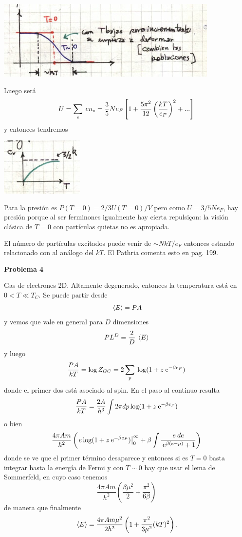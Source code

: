 \documentclass[10pt,oneside]{CBFT_book}
\begin{document}
\includegraphics[scale=0.5]{images/1606329581.jpg}

Luego será
\[
	U = \sum_e \: e n_e = \frac{3}{5} N e_F \left[ 1 + \frac{5\pi^2}{12}\left( \frac{ kT }{ e_F } \right)^2 + ... \right]
\]
y entonces tendremos

\includegraphics[scale=0.5]{images/1606329585.jpg}

Para la presión es $ P(T=0) = 2/3 U(T=0)/V$ pero como $ U = 3/5 N e_F $,
hay presión porque al ser ferminones igualmente hay cierta repulsiçon: la visión clásica de $T=0$ con
partículas quietas no es apropiada.

El número de partículas excitados puede venir de $ \sim N k T / e_F $ entonces estando relacionado
con al análogo del $kT$. El Pathria comenta esto en pag. 199.


\begin{ejemplo}{\bf Problema 4}

Gas de electrones 2D. Altamente degenerado, entonces la temperatura está en $ 0 < T \ll T_C $.
Se puede partir desde
\[
	\:\left\langle E \right\rangle = P A
\]
y vemos que vale en general para $D$ dimensiones
\[
	P L^D = \frac{ 2 }{ D } \:\left\langle  E  \right\rangle
\]
y luego
\[
	\frac{ P A }{ k T } = \log Z_{GC} = 2 \sum_p \: \log ( 1 + z \:\mathrm{e}^{-\beta e_P})
\]
donde el primer dos está asociado al spin. En el paso al continuo resulta
\[
	\frac{ P A }{ k T } = \frac{ 2 A}{h^3} \int 2 \pi dp \log ( 1 + z \:\mathrm{e}^{-\beta e_P}) 
\]
o bien
\[
	\frac{4 \pi A m}{h^2} \left( \left. e \log ( 1 + z \:\mathrm{e}^{-\beta e_P} ) \right|_0^\infty + 
	\beta \int \frac{ e \: de }{\:\mathrm{e}^{\beta(e-\mu)}+1} \right)
\]
donde se ve que el primer término desaparece y entonces si es $T=0$ basta integrar hasta la energía 
de Fermi y con $T\sim 0$ hay que usar el lema de Sommerfeld, en cuyo caso tenemos
\[
	\frac{4 \pi A m}{h^2} \left( \frac{ \beta \mu^2 }{ 2 } + \frac{ \pi^2 }{ 6 \beta } \right)
\]
de manera que finalmente
\[
	\:\left\langle E \right\rangle = \frac{4 \pi A m \mu^2 }{2h^2} \left( 1 + \frac{ \pi^2 }{ 3 \mu^2 }(kT)^2 \right).
\]
\end{ejemplo}
\end{document}
